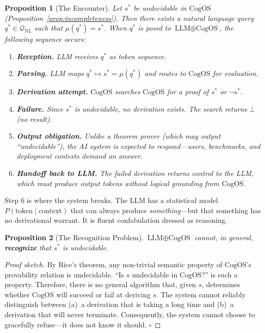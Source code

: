 \documentclass[11pt]{article}
\newtheorem{proposition}{Proposition}
\newcommand{\CogOS}{\text{CogOS}}
\begin{document}
\begin{proposition}[The Encounter]
\label{prop:encounter}
Let $s^*$ be undecidable in $\overline{\CogOS}$
(Proposition~\ref{prop:incompleteness}). Then there exists a natural language
query $q^* \in \mathcal{Q}_{\text{NL}}$ such that $\mu(q^*) = s^*$.
When $q^*$ is posed to $\text{LLM} \oplus \CogOS$, the following sequence
occurs:
\begin{enumerate}
\item \textbf{Reception.} LLM receives $q^*$ as token sequence.
\item \textbf{Parsing.} LLM maps $q^* \mapsto s^* = \mu(q^*)$ and routes to
      $\CogOS$ for evaluation.
\item \textbf{Derivation attempt.} $\CogOS$ searches $\overline{\CogOS}$ for
      a proof of $s^*$ or $\neg s^*$.
\item \textbf{Failure.} Since $s^*$ is undecidable, no derivation exists. The
      search returns $\bot$ (no result).
\item \textbf{Output obligation.} Unlike a theorem prover (which may output
      ``undecidable''), the AI system is \textit{expected to respond}---users,
      benchmarks, and deployment contexts demand an answer.
\item \textbf{Handoff back to LLM.} The failed derivation returns control to
      the LLM, which must produce output tokens \textit{without logical
      grounding from $\CogOS$}.
\end{enumerate}
\end{proposition}

\noindent Step 6 is where the system breaks. The LLM has a statistical model
$P(\text{token} \mid \text{context})$ that can always produce
\textit{something}---but that something has no derivational warrant. It is
fluent confabulation dressed as reasoning.

\begin{proposition}[The Recognition Problem]
\label{prop:recognition}
$\text{LLM} \oplus \CogOS$ cannot, in general, \textbf{recognize} that $s^*$
is undecidable.
\end{proposition}

\begin{proof}[Proof sketch]
By Rice's theorem, any non-trivial semantic property of $\overline{\CogOS}$'s
provability relation is undecidable. ``Is $s$ undecidable in
$\overline{\CogOS}$?'' is such a property. Therefore, there is no general
algorithm that, given $s$, determines whether $\CogOS$ will succeed or fail at
deriving $s$. The system cannot reliably distinguish between (a)~a derivation
that is taking a long time and (b)~a derivation that will never terminate.
Consequently, the system cannot choose to gracefully refuse---it does not know
it should. \hfill $\square$
\end{proof}
\end{document}
